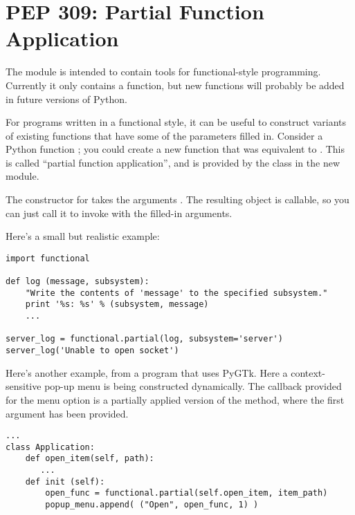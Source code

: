 \documentclass{howto}
\begin{document}
\section{PEP 309: Partial Function Application}

The  module is intended to contain tools for
functional-style programming.  Currently it only contains a
 function, but new functions will probably be added
in future versions of Python.

For programs written in a functional style, it can be useful to
construct variants of existing functions that have some of the
parameters filled in.  Consider a Python function ;
you could create a new function  that was equivalent to
.  This is called ``partial function application'',
and is provided by the  class in the new
 module.

The constructor for  takes the arguments
.  The resulting
object is callable, so you can just call it to invoke 
with the filled-in arguments.

Here's a small but realistic example:

\begin{verbatim}
import functional

def log (message, subsystem):
    "Write the contents of 'message' to the specified subsystem."
    print '%s: %s' % (subsystem, message)
    ...

server_log = functional.partial(log, subsystem='server')
server_log('Unable to open socket')
\end{verbatim}

Here's another example, from a program that uses PyGTk.  Here a
context-sensitive pop-up menu is being constructed dynamically.  The
callback provided for the menu option is a partially applied version
of the  method, where the first argument has been
provided.

\begin{verbatim}
...
class Application:
    def open_item(self, path):
       ...
    def init (self):
        open_func = functional.partial(self.open_item, item_path)
        popup_menu.append( ("Open", open_func, 1) )
\end{verbatim}
\end{document}
